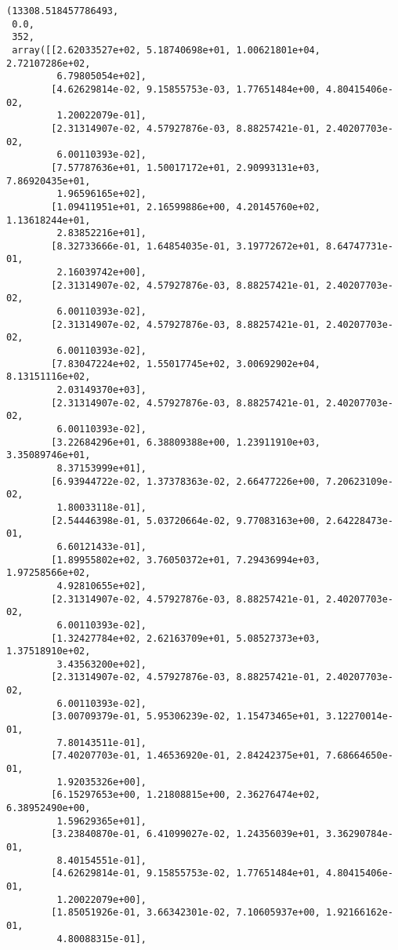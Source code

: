\documentclass[11pt]{article}
\makeatletter
\newcommand{\boxspacing}{\kern\kvtcb@left@rule\kern\kvtcb@boxsep}
\newcommand{\prompt}[4]{
        {\ttfamily\llap{{\color{#2}[#3]:\hspace{3pt}#4}}\vspace{-\baselineskip}}
    }
\makeatother
\begin{document}
            \begin{tcolorbox}[breakable, size=fbox, boxrule=.5pt, pad at break*=1mm, opacityfill=0]
\prompt{Out}{outcolor}{11}{\boxspacing}
\begin{Verbatim}[commandchars=\\\{\}]
(13308.518457786493,
 0.0,
 352,
 array([[2.62033527e+02, 5.18740698e+01, 1.00621801e+04, 2.72107286e+02,
         6.79805054e+02],
        [4.62629814e-02, 9.15855753e-03, 1.77651484e+00, 4.80415406e-02,
         1.20022079e-01],
        [2.31314907e-02, 4.57927876e-03, 8.88257421e-01, 2.40207703e-02,
         6.00110393e-02],
        [7.57787636e+01, 1.50017172e+01, 2.90993131e+03, 7.86920435e+01,
         1.96596165e+02],
        [1.09411951e+01, 2.16599886e+00, 4.20145760e+02, 1.13618244e+01,
         2.83852216e+01],
        [8.32733666e-01, 1.64854035e-01, 3.19772672e+01, 8.64747731e-01,
         2.16039742e+00],
        [2.31314907e-02, 4.57927876e-03, 8.88257421e-01, 2.40207703e-02,
         6.00110393e-02],
        [2.31314907e-02, 4.57927876e-03, 8.88257421e-01, 2.40207703e-02,
         6.00110393e-02],
        [7.83047224e+02, 1.55017745e+02, 3.00692902e+04, 8.13151116e+02,
         2.03149370e+03],
        [2.31314907e-02, 4.57927876e-03, 8.88257421e-01, 2.40207703e-02,
         6.00110393e-02],
        [3.22684296e+01, 6.38809388e+00, 1.23911910e+03, 3.35089746e+01,
         8.37153999e+01],
        [6.93944722e-02, 1.37378363e-02, 2.66477226e+00, 7.20623109e-02,
         1.80033118e-01],
        [2.54446398e-01, 5.03720664e-02, 9.77083163e+00, 2.64228473e-01,
         6.60121433e-01],
        [1.89955802e+02, 3.76050372e+01, 7.29436994e+03, 1.97258566e+02,
         4.92810655e+02],
        [2.31314907e-02, 4.57927876e-03, 8.88257421e-01, 2.40207703e-02,
         6.00110393e-02],
        [1.32427784e+02, 2.62163709e+01, 5.08527373e+03, 1.37518910e+02,
         3.43563200e+02],
        [2.31314907e-02, 4.57927876e-03, 8.88257421e-01, 2.40207703e-02,
         6.00110393e-02],
        [3.00709379e-01, 5.95306239e-02, 1.15473465e+01, 3.12270014e-01,
         7.80143511e-01],
        [7.40207703e-01, 1.46536920e-01, 2.84242375e+01, 7.68664650e-01,
         1.92035326e+00],
        [6.15297653e+00, 1.21808815e+00, 2.36276474e+02, 6.38952490e+00,
         1.59629365e+01],
        [3.23840870e-01, 6.41099027e-02, 1.24356039e+01, 3.36290784e-01,
         8.40154551e-01],
        [4.62629814e-01, 9.15855753e-02, 1.77651484e+01, 4.80415406e-01,
         1.20022079e+00],
        [1.85051926e-01, 3.66342301e-02, 7.10605937e+00, 1.92166162e-01,
         4.80088315e-01],

\end{Verbatim}
\end{tcolorbox}
\end{document}
